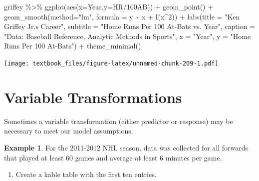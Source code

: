 \documentclass[
  11pt,
]{book}
\newenvironment{Shaded}{\begin{snugshade}}{\end{snugshade}}
\newcommand{\AttributeTok}[1]{\textcolor[rgb]{0.77,0.63,0.00}{#1}}
\newcommand{\DecValTok}[1]{\textcolor[rgb]{0.00,0.00,0.81}{#1}}
\newcommand{\FunctionTok}[1]{\textcolor[rgb]{0.00,0.00,0.00}{#1}}
\newcommand{\NormalTok}[1]{#1}
\newcommand{\SpecialCharTok}[1]{\textcolor[rgb]{0.00,0.00,0.00}{#1}}
\newcommand{\StringTok}[1]{\textcolor[rgb]{0.31,0.60,0.02}{#1}}
\providecommand{\tightlist}{%
  \setlength{\itemsep}{0pt}\setlength{\parskip}{0pt}}
\theoremstyle{definition}
\theoremstyle{definition}
\newtheorem{example}{Example}[chapter]
\theoremstyle{definition}
\theoremstyle{definition}
\theoremstyle{remark}
\begin{document}
\newpage

\begin{Shaded}
\begin{Highlighting}[]
\NormalTok{griffey }\SpecialCharTok{\%\textgreater{}\%} \FunctionTok{ggplot}\NormalTok{(}\FunctionTok{aes}\NormalTok{(}\AttributeTok{x=}\NormalTok{Year,}\AttributeTok{y=}\StringTok{\textasciigrave{}}\AttributeTok{HR/100AB}\StringTok{\textasciigrave{}}\NormalTok{)) }\SpecialCharTok{+}
  \FunctionTok{geom\_point}\NormalTok{() }\SpecialCharTok{+}
  \FunctionTok{geom\_smooth}\NormalTok{(}\AttributeTok{method=}\StringTok{"lm"}\NormalTok{, }\AttributeTok{formula =}\NormalTok{ y }\SpecialCharTok{\textasciitilde{}}\NormalTok{ x }\SpecialCharTok{+} \FunctionTok{I}\NormalTok{(x}\SpecialCharTok{\^{}}\DecValTok{2}\NormalTok{)) }\SpecialCharTok{+} 
  \FunctionTok{labs}\NormalTok{(}\AttributeTok{title =} \StringTok{"Ken Griffey Jr.\textquotesingle{}s Career"}\NormalTok{,}
       \AttributeTok{subtitle =} \StringTok{"Home Runs Per 100 At{-}Bats vs. Year"}\NormalTok{,}
       \AttributeTok{caption =} \StringTok{"Data: Baseball Reference, Analytic Methods in Sports"}\NormalTok{, }
       \AttributeTok{x =} \StringTok{"Year"}\NormalTok{,}
       \AttributeTok{y =} \StringTok{"Home Runs Per 100 At{-}Bats"}\NormalTok{) }\SpecialCharTok{+}
  \FunctionTok{theme\_minimal}\NormalTok{()}
\end{Highlighting}
\end{Shaded}

\texttt{[image: textbook\_files/figure-latex/unnamed-chunk-209-1.pdf]}

\newpage

\hypertarget{variable-transformations}{%
\section{Variable Transformations}\label{variable-transformations}}

Sometimes a variable transformation (either predictor or response) may be necessary to meet our model assumptions.

\begin{example}
For the 2011-2012 NHL season, data was collected for all forwards that played at least 60 games and average at least 6 minutes per game.
\end{example}

\begin{enumerate}
\def\labelenumi{(\alph{enumi})}
\tightlist
\item
  Create a kable table with the first ten entries.
\end{enumerate}
\end{document}
